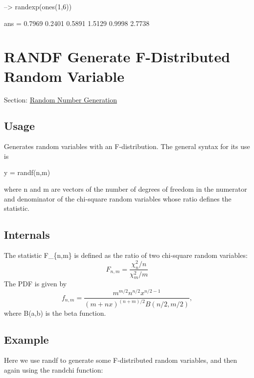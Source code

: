\begin{DoxyVerbInclude}
--> randexp(ones(1,6))

ans = 
    0.7969    0.2401    0.5891    1.5129    0.9998    2.7738 
\end{DoxyVerbInclude}
 \hypertarget{random_randf}{}\section{R\-A\-N\-D\-F Generate F-\/\-Distributed Random Variable}\label{random_randf}
Section\-: \hyperlink{sec_random}{Random Number Generation} \hypertarget{vtkwidgets_vtkxyplotwidget_Usage}{}\subsection{Usage}\label{vtkwidgets_vtkxyplotwidget_Usage}
Generates random variables with an F-\/distribution. The general syntax for its use is \begin{DoxyVerb}   y = randf(n,m)
\end{DoxyVerb}
 where {\ttfamily n} and {\ttfamily m} are vectors of the number of degrees of freedom in the numerator and denominator of the chi-\/square random variables whose ratio defines the statistic. \hypertarget{transforms_svd_Function}{}\subsection{Internals}\label{transforms_svd_Function}
The statistic {\ttfamily F\-\_\-\{n,m\}} is defined as the ratio of two chi-\/square random variables\-: \[ F_{n,m} = \frac{\chi_n^2/n}{\chi_m^2/m} \] The P\-D\-F is given by \[ f_{n,m} = \frac{m^{m/2}n^{n/2}x^{n/2-1}}{(m+nx)^{(n+m)/2}B(n/2,m/2)}, \] where {\ttfamily B(a,b)} is the beta function. \hypertarget{variables_struct_Example}{}\subsection{Example}\label{variables_struct_Example}
Here we use {\ttfamily randf} to generate some F-\/distributed random variables, and then again using the {\ttfamily randchi} function\-:


